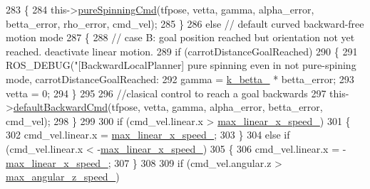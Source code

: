 \begin{DoxyCode}
283                 \{
284                     this->\hyperlink{classcl__move__base__z_1_1backward__local__planner_1_1BackwardLocalPlanner_aaa88a0a47e7cfd449c59518577599928}{pureSpinningCmd}(tfpose, vetta, gamma, alpha\_error, betta\_error, 
      rho\_error, cmd\_vel);
285                 \}
286                 \textcolor{keywordflow}{else} \textcolor{comment}{// default curved backward-free motion mode}
287                 \{
288                     \textcolor{comment}{// case B: goal position reached but orientation not yet reached. deactivate linear
       motion.}
289                     \textcolor{keywordflow}{if} (carrotDistanceGoalReached)
290                     \{
291                         ROS\_DEBUG(\textcolor{stringliteral}{"[BackwardLocalPlanner] pure spinning even in not pure-spining mode,
       carrotDistanceGoalReached: %
292                         gamma = \hyperlink{classcl__move__base__z_1_1backward__local__planner_1_1BackwardLocalPlanner_a9f257183d87f1d732cb7e404f09905ad}{k\_betta\_} * betta\_error;
293                         vetta = 0;
294                     \}
295 
296                     \textcolor{comment}{//clasical control to reach a goal backwards}
297                     this->\hyperlink{classcl__move__base__z_1_1backward__local__planner_1_1BackwardLocalPlanner_a1ebd69a028a22e3573e98f89d593f97d}{defaultBackwardCmd}(tfpose, vetta, gamma, alpha\_error, 
      betta\_error, cmd\_vel);
298                 \}
299 
300                 \textcolor{keywordflow}{if} (cmd\_vel.linear.x > \hyperlink{classcl__move__base__z_1_1backward__local__planner_1_1BackwardLocalPlanner_ae4399072e9ae9cc60d8837860dc4807b}{max\_linear\_x\_speed\_})
301                 \{
302                     cmd\_vel.linear.x = \hyperlink{classcl__move__base__z_1_1backward__local__planner_1_1BackwardLocalPlanner_ae4399072e9ae9cc60d8837860dc4807b}{max\_linear\_x\_speed\_};
303                 \}
304                 \textcolor{keywordflow}{else} \textcolor{keywordflow}{if} (cmd\_vel.linear.x < -\hyperlink{classcl__move__base__z_1_1backward__local__planner_1_1BackwardLocalPlanner_ae4399072e9ae9cc60d8837860dc4807b}{max\_linear\_x\_speed\_})
305                 \{
306                     cmd\_vel.linear.x = -\hyperlink{classcl__move__base__z_1_1backward__local__planner_1_1BackwardLocalPlanner_ae4399072e9ae9cc60d8837860dc4807b}{max\_linear\_x\_speed\_};
307                 \}
308 
309                 \textcolor{keywordflow}{if} (cmd\_vel.angular.z > \hyperlink{classcl__move__base__z_1_1backward__local__planner_1_1BackwardLocalPlanner_af7e492339ee2d1c90c00f6dd4cf95551}{max\_angular\_z\_speed\_})
}
\end{DoxyCode}
